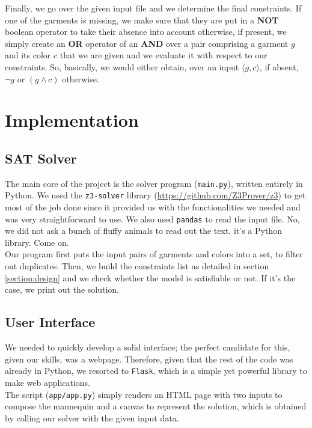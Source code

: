\documentclass[12pt]{article}
\begin{document}
    Finally, we go over the given input file and we determine the final constraints. If one of the garments is missing, we make sure that they are put in a \textbf{NOT} boolean operator to take their absence into account otherwise, if present, we simply create an \textbf{OR} operator of an \textbf{AND} over a pair comprising a garment $g$ and its color $c$ that we are given and we evaluate it with respect to our constraints. So, basically, we would either obtain, over an input $\langle g, c \rangle$, if absent, $\neg g$ or $(g \wedge c)$ otherwise.


\section{Implementation}

    \subsection{SAT Solver}
        The main core of the project is the solver program (\texttt{main.py}), written entirely in Python. 
        We used the \texttt{z3-solver} library (\url{https://github.com/Z3Prover/z3}) to get most of the job done since it provided us with the functionalities
        we needed and was very straightforward to use. We also used \texttt{pandas} to read the input file. No, we did not ask a bunch of fluffy animals to read out the text, it's a Python library. Come on.\\
        Our program first puts the input pairs of garments and colors into a set, to filter out duplicates. Then, we build the constraints list as detailed in section \ref{section:design} and we check whether the model is
        satisfiable or not. If it's the case, we print out the solution.

    \subsection{User Interface}
        We needed to quickly develop a solid interface; the perfect candidate for this, given our skills, was a webpage. Therefore, given that the rest of the code
        was already in Python, we resorted to \texttt{Flask}, which is a simple yet powerful library to make web applications.\\
        The script (\texttt{app/app.py}) simply renders an HTML page with two inputs to compose the mannequin and a canvas to represent the solution, which is obtained by 
        calling our solver with the given input data.
\end{document}

